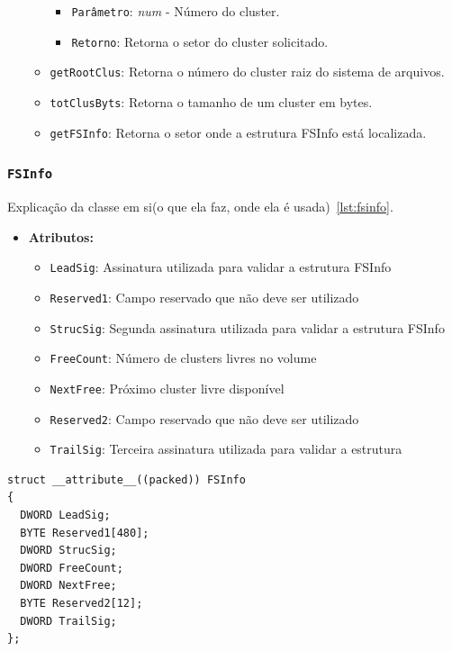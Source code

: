 \documentclass[
    12pt,				%
    oneside,   	        %
    a4paper,			%
    english,			%
    french,				%
    spanish,			%
    brazil,				%
    ]{pacotes/abntex2}
\begin{document}
\begin{itemize}
\begin{itemize}
\begin{itemize}
                \item \texttt{Parâmetro}: \textit{num} - Número do cluster.
                \item \texttt{Retorno}: Retorna o setor do cluster solicitado.
            \end{itemize}
            \item \texttt{getRootClus}: Retorna o número do cluster raiz do sistema de arquivos.
            \item \texttt{totClusByts}: Retorna o tamanho de um cluster em bytes.
            \item \texttt{getFSInfo}: Retorna o setor onde a estrutura FSInfo está localizada.
        \end{itemize}
\end{itemize}

\subsubsection{\texttt{FSInfo}}
\label{subsubsec:fsinfo}

Explicação da classe em si(o que ela faz, onde ela é usada)~\ref{lst:fsinfo}.

\begin{itemize}
    \item \textbf{Atributos:}
        \begin{itemize}
            \item \texttt{LeadSig}: Assinatura utilizada para validar a estrutura FSInfo
            \item \texttt{Reserved1}: Campo reservado que não deve ser utilizado
            \item \texttt{StrucSig}: Segunda assinatura utilizada para validar a estrutura FSInfo
            \item \texttt{FreeCount}: Número de clusters livres no volume
            \item \texttt{NextFree}: Próximo cluster livre disponível
            \item \texttt{Reserved2}: Campo reservado que não deve ser utilizado
            \item \texttt{TrailSig}: Terceira assinatura utilizada para validar a estrutura
        \end{itemize}
\end{itemize}


\begin{lstlisting}[caption={Estrutura que representa o FSInfo encontrado no volume FAT}, label={lst:fsinfo}]
struct __attribute__((packed)) FSInfo
{
  DWORD LeadSig;
  BYTE Reserved1[480]; 
  DWORD StrucSig; 
  DWORD FreeCount; 
  DWORD NextFree; 
  BYTE Reserved2[12]; 
  DWORD TrailSig; 
};
\end{lstlisting}
\end{document}
